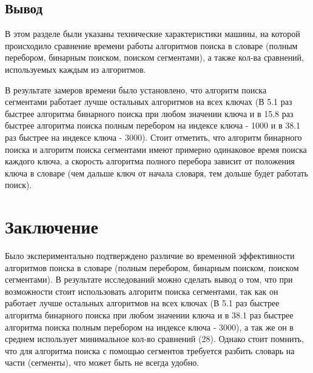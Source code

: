 \documentclass[a4paper,14pt, unknownkeysallowed]{extreport}
\begin{document}
\clearpage

\section{Вывод}

В этом разделе были указаны технические характеристики машины, на которой происходило сравнение времени работы алгоритмов поиска в словаре (полным перебором, бинарным поиском, поиском сегментами), а также кол-ва сравнений, используемых каждым из алгоритмов.



В результате замеров времени было установлено, что 
алгоритм поиска сегментами работает лучше остальных алгоритмов на всех ключах (В 5.1 раз быстрее алгоритма бинарного поиска при любом значении ключа и в 15.8 раз быстрее алгоритма поиска полным перебором на индексе ключа - 1000 и в 38.1 раз быстрее на индексе ключа - 3000). Стоит отметить, что алгоритм бинарного поиска и алгоритм поиска сегментами имеют примерно одинаковое время поиска каждого ключа, а скорость алгоритма полного перебора зависит от положения ключа в словаре (чем дальше ключ от начала словаря, тем дольше будет работать поиск).



\chapter*{Заключение}

Было экспериментально подтверждено различие во временной эффективности алгоритмов поиска в словаре (полным перебором, бинарным поиском, поиском сегментами). В результате исследований можно сделать вывод о том, что при возможности стоит использовать алгоритм поиска сегментами, так как он работает лучше остальных алгоритмов на всех ключах (В 5.1 раз быстрее алгоритма бинарного поиска при любом значении ключа и в 38.1 раз быстрее алгоритма поиска полным перебором на индексе ключа - 3000), а так же он в среднем использует минимальное кол-во сравнений (28). Однако стоит помнить, что для алгоритма поиска с помощью сегментов требуется разбить словарь на части (сегменты), что может быть не всегда удобно.


\vspace{5mm}
\end{document}

